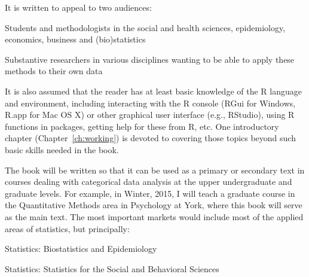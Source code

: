 \documentclass{article}
\newcommand{\chref}[1]{Chapter~\ref{#1}}
\newcommand{\VCDe}{\textsf{VCD}$^{2e}$\xspace}
\newcommand{\VCDR}{\textsf{VCDR}\xspace}
\newcommand{\R}{\textsf{R}\xspace}
\begin{document}
It is written to appeal to two audiences:

\begin{itemize*}
	\item Students and methodologists in the social and health sciences, epidemiology,
    economics, business
	and (bio)statistics
	\item Substantive researchers in various disciplines wanting to be able to
	apply these methods to their own data
\end{itemize*}

It is also assumed that the reader has at least basic knowledge of the \R language and
environment, including interacting with the \R console (RGui for Windows, R.app for Mac OS X)
or other graphical user interface (e.g., RStudio), using \R functions in packages,
getting help for these from \R, etc.  One introductory chapter (\chref{ch:working}) is devoted
to covering those topics beyond such basic skills needed in the book.

The book will be written so that it can be used as a primary or secondary text in
courses dealing with categorical data analysis at the upper undergraduate and
graduate levels.  For example, in Winter, 2015,  I will teach a graduate course in
the Quantitative Methods area in Psychology at York, where this book will serve
as the main text. 
The most important markets would include most of the
applied areas of statistics, but principally:

\begin{itemize*}
\item Statistics: Biostatistics and Epidemiology
\item Statistics: Statistics for the Social and Behavioral Sciences
\end{itemize*}

%
\end{document}
